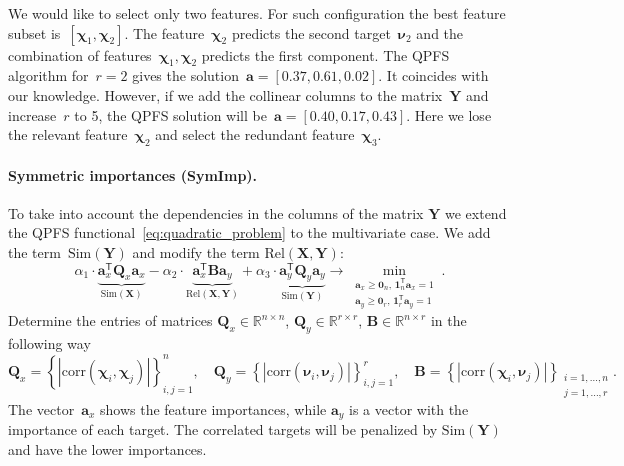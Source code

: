 \documentclass[12pt,twoside]{article}
\theoremstyle{definition}
\newcommand{\ba}{\mathbf{a}}
\newcommand{\bY}{\mathbf{Y}}
\newcommand{\bX}{\mathbf{X}}
\newcommand{\bB}{\mathbf{B}}
\newcommand{\bQ}{\mathbf{Q}}
\newcommand{\bbR}{\mathbb{R}}
\newcommand{\T}{\mathsf{T}}
\newcommand{\bchi}{\boldsymbol{\chi}}
\newcommand{\bnu}{\boldsymbol{\nu}}
\newcommand{\bOne}{\boldsymbol{1}}
\newcommand{\bZero}{\boldsymbol{0}}
\begin{document}
We would like to select only two features.
For such configuration the best feature subset is~$[\bchi_1, \bchi_2]$.
The feature~$\bchi_2$ predicts the second target~$\bnu_2$ and the combination of features~$\bchi_1, \bchi_2$ predicts the first component.
The QPFS algorithm for~$r=2$ gives the solution~$\ba = [0.37,	0.61,	0.02]$. It coincides with our knowledge.
However, if we add the collinear columns to the matrix~$\bY$ and increase~$r$ to 5, the QPFS solution will be~$\ba = [0.40,	0.17, 0.43]$.
Here we lose the relevant feature~$\bchi_2$ and select the redundant feature~$\bchi_3$.

\paragraph{Symmetric importances (SymImp).}

To take into account the dependencies in the columns of the matrix $\bY$ we extend the QPFS functional~\eqref{eq:quadratic_problem} to the multivariate case.
We add the term~$\text{Sim}(\bY)$ and modify the term $\text{Rel}(\bX, \bY)$:
\begin{equation}
	\alpha_1 \cdot \underbrace{\ba_x^{\T} \bQ_x \ba_x}_{\text{Sim}(\bX)} - \alpha_2 \cdot \underbrace{\ba_x^{\T} \bB \ba_y}_{\text{Rel}(\bX, \bY)} + \alpha_3 \cdot \underbrace{\ba_y^{\T} \bQ_y \ba_y}_{\text{Sim}(\bY)} \rightarrow \min_{\substack{\ba_x \geq \bZero_n, \, \bOne_n^{\T}\ba_x=1 \\ \ba_y \geq \bZero_r, \, \bOne_r^{\T}\ba_y=1}}.
	\label{eq:multivariate_quadratic_problem}
\end{equation}
Determine the entries of matrices $\bQ_x \in \bbR^{n \times n}$, $\bQ_y \in \bbR^{r \times r}$, $\bB \in \bbR^{n \times r}$ in the following way
\begin{equation*}
	\bQ_x = \left\{ \left| \text{corr}(\bchi_i, \bchi_j) \right| \right\}_{i,j=1}^n, \quad
	\bQ_y = \left\{ \left| \text{corr}(\bnu_i, \bnu_j) \right| \right\}_{i,j=1}^r, \quad
	\bB =  \left\{ \left| \text{corr}(\bchi_i, \bnu_j) \right| \right\}_{\substack{i=1, \dots, n \\ j=1, \dots, r}}.
\end{equation*}
The vector~$\ba_x$ shows the feature importances, while $\ba_y$ is a vector with the importance of each target.
The correlated targets will be penalized by $\text{Sim} (\bY)$ and have the lower importances.
\end{document}
